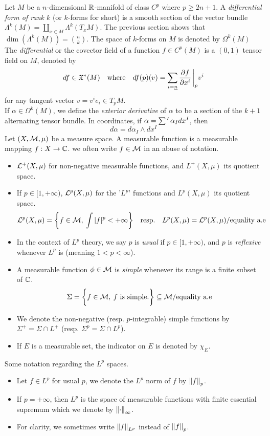 \documentclass[../main-v2-manifolds.tex]{subfiles}
\begin{document}
Let $M$ be a $n$-dimensional $\mathbb{R}$-manifold of class $C^p$ where $p\geq2n+1$. A \emph{differential form of rank $k$} (or $k$-forms for short) is a smooth section of the vector bundle $\Lambda^k(M) = \coprod_{x\in M}\Lambda^k(T_xM)$. The previous section shows that $\dim(\Lambda^k(M)) = \binom{n}{k}$. The space of $k$-forms on $M$ is denoted by $\Omega^k(M)$\\

The \emph{differential} or the covector field of a function $f\in C^p(M)$ is a $(0,1)$ tensor field on $M$, denoted by 
\[
    df\in\mathfrak{X}^*(M)\qqtext{where} df(p)(v) = \sum_{i=\underline{n}}\pdv{f}{x^i}\eval_pv^i
\]
for any tangent vector $v = v^ie_i\in T_pM$.\\

If $\alpha\in \Omega^k(M)$, we define the \emph{exterior derivative} of $\alpha$ to be a section of the $k+1$ alternating tensor bundle. In coordinates, if $\alpha = \mathop{\sum\nolimits{'}} \alpha_I dx^I$, then 
\[
    d\alpha =  d\alpha_I \wedge dx^I
\]
Let $(X,\mathcal{M},\mu)$ be a measure space. A measurable function is a measurable mapping $f:X\to{\mathbb{C}}$. we often write $f\in \mathcal{M}$ in an abuse of notation.
\begin{itemize}
    \item ${\mathcal{L}}^+(X,\mu)$ for non-negative measurable functions, and $L^+(X,\mu)$ its quotient space.
    \item If $p\in [1,+\infty)$, ${\mathcal{L}}^p(X,\mu)$ for the '$L^p$' functions and $L^p(X,\mu)$ its quotient space.
    \[
        \lcal^p(X,\mu) = \bigset{f\in\mcal,\: \int\abs{f}^p<+\infty}\qqtext{resp.} L^p(X,\mu) = \lcal^p(X,\mu)/\text{equality a.e}
    \]
    \item In the context of $L^p$ theory, we say $p$ is \emph{usual} if $p\in [1,+\infty)$, and $p$ is \emph{reflexive} whenever $L^p$ is (meaning $1< p <\infty$).
    \item A measurable function $\phi\in\mathcal{M}$ is \emph{simple} whenever its range is a finite subset of ${\mathbb{C}}$. 
    \[
        \Sigma = \biggl\{{f\in\mathcal{M},\: f\text{ is simple.}}\biggr\}\subseteq\mathcal{M}/{\text{equality a.e}}
    \]
    \item We denote the non-negative (resp. $p$-integrable) simple functions by $\Sigma^+ = \Sigma\cap L^+$ (resp. $\Sigma^p = \Sigma\cap L^p$).
    \item If $E$ is a measurable set, the indicator on $E$ is denoted by $\chi_E$.
\end{itemize}
Some notation regarding the $L^p$ spaces.
\begin{itemize}
    \item Let $f\in L^p$ for usual $p$, we denote the $L^p$ norm of $f$ by $\norm{f}_p$.
    \item If $p=+\infty$, then $L^p$ is the space of measurable functions with finite essential supremum which we denote by $\norm{\cdot}_{\infty}$. 
    \item For clarity, we sometimes write $\norm{f}_{L^p}$ instead of $\norm{f}_{p}$.
\end{itemize}
\end{document}
